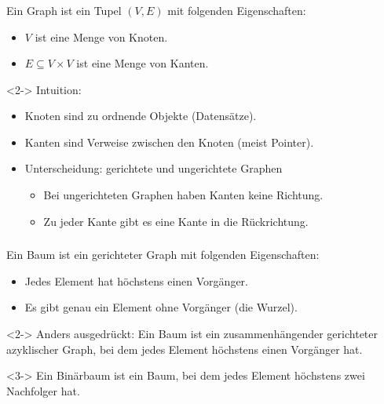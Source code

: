 \begin{frame}
\frametitle{\insertsection}
\begin{definition}[Graph]
Ein \alert{Graph} ist ein Tupel $(V,E)$ mit folgenden Eigenschaften:
\begin{itemize}
	\item $V$ ist eine Menge von \alert{Knoten}.
	\item $E \subseteq V \times V$ ist eine Menge von \alert{Kanten}.
\end{itemize}
\end{definition}
\begin{block}<2->
{Intuition:}
\begin{itemize}
	\item Knoten sind zu ordnende \alert{Objekte} (Datensätze).
	\item Kanten sind \alert{Verweise} zwischen den Knoten (meist \alert{Pointer}).
	\item Unterscheidung: \alert{gerichtete} und \alert{ungerichtete} Graphen
	\begin{itemize}
		\item Bei ungerichteten Graphen haben Kanten keine Richtung.
		\item Zu jeder Kante gibt es eine Kante in die Rückrichtung.
	\end{itemize}
\end{itemize}
\end{block}
\end{frame}

\begin{frame}
\frametitle{\insertsection}
\begin{definition}[Baum]
Ein \alert{Baum} ist ein gerichteter Graph mit folgenden Eigenschaften:
\begin{itemize}
	\item Jedes Element hat höchstens einen Vorgänger.
	\item Es gibt genau ein Element ohne Vorgänger (die \alert{Wurzel}).
\end{itemize}
\begin{block}<2->
{Anders ausgedrückt:}
\glqq Ein Baum ist ein \alert{zusammenhängender gerichteter azyklischer Graph},
bei dem jedes Element höchstens einen Vorgänger hat.\grqq
\end{block}
\end{definition}
\begin{definition}[Binärbaum]<3->
Ein \alert{Binärbaum} ist ein Baum, bei dem jedes Element höchstens zwei Nachfolger hat.
\end{definition}
\end{frame}

